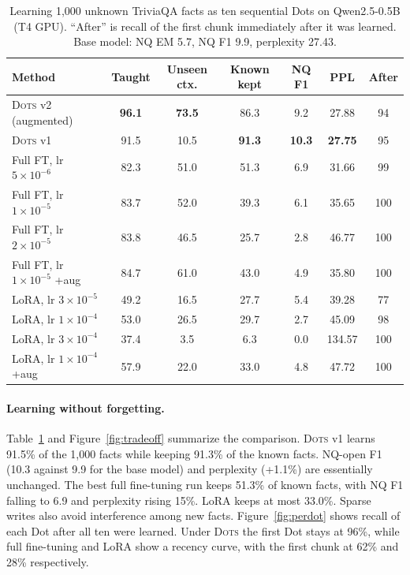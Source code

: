 \documentclass[11pt]{article}
\newcommand{\sys}{\textsc{Dots}}
\begin{document}
\begin{table}[t]
\centering
\small
\caption{Learning 1{,}000 unknown TriviaQA facts as ten sequential Dots on Qwen2.5-0.5B (T4 GPU). ``After'' is recall of the first chunk immediately after it was learned. Base model: NQ EM 5.7, NQ F1 9.9, perplexity 27.43.}
\label{tab:main}
\begin{tabular}{lcccccc}
\toprule
Method & Taught & Unseen ctx. & Known kept & NQ F1 & PPL & After \\
\midrule
\sys{} v2 (augmented) & \textbf{96.1} & \textbf{73.5} & 86.3 & 9.2 & 27.88 & 94 \\
\sys{} v1 & 91.5 & 10.5 & \textbf{91.3} & \textbf{10.3} & \textbf{27.75} & 95 \\
\midrule
Full FT, lr $5\!\times\!10^{-6}$ & 82.3 & 51.0 & 51.3 & 6.9 & 31.66 & 99 \\
Full FT, lr $1\!\times\!10^{-5}$ & 83.7 & 52.0 & 39.3 & 6.1 & 35.65 & 100 \\
Full FT, lr $2\!\times\!10^{-5}$ & 83.8 & 46.5 & 25.7 & 2.8 & 46.77 & 100 \\
Full FT, lr $1\!\times\!10^{-5}$ +aug & 84.7 & 61.0 & 43.0 & 4.9 & 35.80 & 100 \\
\midrule
LoRA, lr $3\!\times\!10^{-5}$ & 49.2 & 16.5 & 27.7 & 5.4 & 39.28 & 77 \\
LoRA, lr $1\!\times\!10^{-4}$ & 53.0 & 26.5 & 29.7 & 2.7 & 45.09 & 98 \\
LoRA, lr $3\!\times\!10^{-4}$ & 37.4 & 3.5 & 6.3 & 0.0 & 134.57 & 100 \\
LoRA, lr $1\!\times\!10^{-4}$ +aug & 57.9 & 22.0 & 33.0 & 4.8 & 47.72 & 100 \\
\bottomrule
\end{tabular}
\end{table}

\paragraph{Learning without forgetting.} Table~\ref{tab:main} and Figure~\ref{fig:tradeoff} summarize the comparison. \sys{} v1 learns 91.5\% of the 1{,}000 facts while keeping 91.3\% of the known facts. NQ-open F1 (10.3 against 9.9 for the base model) and perplexity (+1.1\%) are essentially unchanged. The best full fine-tuning run keeps 51.3\% of known facts, with NQ F1 falling to 6.9 and perplexity rising 15\%. LoRA keeps at most 33.0\%. Sparse writes also avoid interference among new facts. Figure~\ref{fig:perdot} shows recall of each Dot after all ten were learned. Under \sys{} the first Dot stays at 96\%, while full fine-tuning and LoRA show a recency curve, with the first chunk at 62\% and 28\% respectively.
\end{document}
